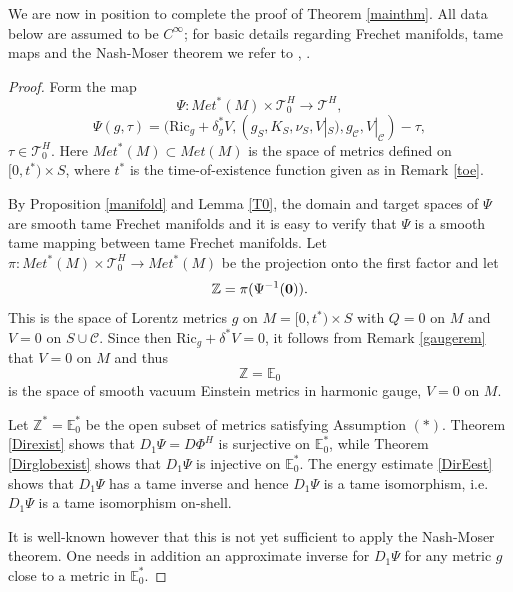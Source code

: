 \documentclass[10pt]{amsart}
\renewcommand{\d}{\delta}
\newcommand{\cC}{{\mathcal C}}
\newcommand{\cT}{{\mathcal T}}
\newcommand{\bZ}{\mathbb Z}
\newcommand{\bE}{\mathbb E}
\newcommand{\Ric}{\mathrm{Ric}}
\newcommand{\be}{\begin{equation}}
\newcommand{\ee}{\end{equation}}
\renewcommand{\to}{\rightarrow}
\newcommand{\<}{\langle}
\renewcommand{\>}{\rangle}
\theoremstyle{plain}
\theoremstyle{remark}
\theoremstyle{definition}
\numberwithin{equation}{section}
\begin{document}
  We are now in position to complete the proof of Theorem \ref{mainthm}. All data below are assumed to be $C^{\infty}$; for basic details regarding Frechet manifolds, 
tame maps and the Nash-Moser theorem we refer to \cite{Ham}, \cite{Z2}. 

\begin{proof}

Form the map 
$$\Psi: Met^*(M)\times \cT_0^H \to \cT^H ,$$
\be
\Psi(g, \tau) = (\Ric_g + \d_g^* V, (g_S, K_S, \nu_S, V|_S), g_{\cC}, V|_{\cC}) - \tau, 
\ee
$\tau \in \cT_0^H$. Here $Met^*(M) \subset Met(M)$ is the space of metrics defined on $[0, t^*)\times S$, where $t^*$ is the time-of-existence function 
given as in Remark \ref{toe}. 

By Proposition \ref{manifold} and Lemma \ref{T0}, the domain and target spaces of $\Psi$ are smooth tame Frechet manifolds and it is easy to verify that 
$\Psi$ is a smooth tame mapping between tame Frechet manifolds. Let $\pi: Met^*(M) \times \cT_0^H \to Met^*(M)$ be the projection onto the first factor 
and let 
$$\bZ = \pi(\Psi^{-1}({\bf 0})).$$
This is the space of Lorentz metrics $g$ on $M = [0, t^*)\times S$ with $Q  = 0$ on $M$ and $V = 0$ on $S \cup \cC$. Since then $\Ric_g + \d^*V = 0$, 
it follows from Remark \ref{gaugerem} that $V = 0$ on $M$ and thus 
$$\bZ = \bE_0$$
is the space of smooth vacuum Einstein metrics in harmonic gauge, $V = 0$ on $M$. 

   Let $\bZ^* = \bE_0^*$ be the open subset of metrics satisfying Assumption $(*)$. Theorem \ref{Direxist} shows that $D_1 \Psi = D\Phi^H$ is surjective 
on $\bE_0^*$, while Theorem \ref{Dirglobexist} shows that $D_1 \Psi$ is injective on $\bE_0^*$. The energy estimate \eqref{DirEest} shows that 
$D_1\Psi$ has a tame inverse and hence $D_1\Psi$ is a tame isomorphism, i.e.~$D_1 \Psi$ is a tame isomorphism on-shell. 

  It is well-known however that this is not yet sufficient to apply the Nash-Moser theorem. One needs in addition an approximate inverse for $D_1 \Psi$ for any 
metric $g$ close to a metric in $\bE_0^*$. 


\end{proof}
\end{document}
